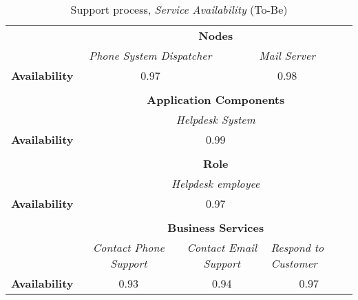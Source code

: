 \begin{table}[H]
	\centering
	\begin{tabular}{|c|c|p{2.5cm}|p{2.5cm}|p{2.5cm}|p{2.5cm}|}

		\cline{3-6}

		\multicolumn{2}{c}{} & \multicolumn{4}{|c|}{\textbf{Nodes}} \\ \cline{3-6}
		\multicolumn{2}{c|}{} & \multicolumn{2}{|c|}{\textsl{Phone System Dispatcher}} & \multicolumn{2}{|c|}{\textsl{Mail Server}}\\ \hline
		\multicolumn{2}{|c|}{\textbf{Availability}} & \multicolumn{2}{|c|}{0.97} & \multicolumn{2}{|c|}{0.98} \\  \hline

		\multicolumn{6}{c}{} \\ \cline{3-6}							
		\multicolumn{2}{c}{} & \multicolumn{4}{|c|}{\textbf{Application Components}} \\ \cline{3-6}
		\multicolumn{2}{c|}{} & \multicolumn{4}{c|}{\textsl{Helpdesk System}} \\
		\hline
		\multicolumn{2}{|c|}{\textbf{Availability}} & \multicolumn{4}{c|}{0.99} \\ \hline

	   \multicolumn{6}{c}{} \\ \cline{3-6}
		\multicolumn{2}{c}{} & \multicolumn{4}{|c|}{\textbf{Role}} \\ \cline{3-6}
		\multicolumn{2}{c|}{} & \multicolumn{4}{|c|}{\textsl{Helpdesk employee}}\\ \hline
		\multicolumn{2}{|c|}{\textbf{Availability}}& \multicolumn{4}{|c|}{0.97} \\  \hline
		
		\multicolumn{6}{c}{} \\ \cline{3-6}
		\multicolumn{2}{c}{} & \multicolumn{4}{|c|}{\textbf{Business Services}} \\ \cline{3-6}
		\multicolumn{2}{c|}{} & \multicolumn{1}{|c|}{\textsl{Contact Phone Support}} & \multicolumn{2}{|c|}{\textsl{Contact Email Support}} & \multicolumn{1}{|p{2cm}|}{\textsl{Respond to Customer}}\\ \hline
		\multicolumn{2}{|c|}{\textbf{Availability}}& \multicolumn{1}{|c|}{0.93} & \multicolumn{2}{|c|}{0.94} & \multicolumn{1}{|c|}{0.97}\\ \hline
	\end{tabular}
\caption{Support process, \textsl{Service Availability} (To-Be)} 
\label{tab:support_to_be}
\end{table}